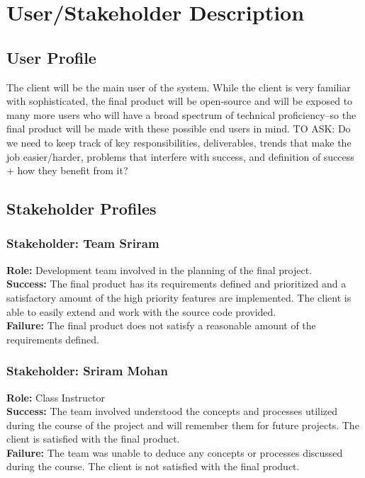 \documentclass{article}
\begin{document}
\section{User/Stakeholder Description}

\subsection{User Profile}
The client will be the main user of the system.  While the client is very familiar with sophisticated, the final product will be open-source and will be exposed to many more users who will have a broad spectrum of technical proficiency--so the final product will be made with these possible end users in mind.
TO ASK: Do we need to keep track of key responsibilities, deliverables, trends that make the job easier/harder, problems that interfere with success, and definition of success + how they benefit from it?

\subsection{Stakeholder Profiles}

\subsubsection{Stakeholder: Team Sriram}
\textbf{Role:} Development team involved in the planning of the final project.\\
\textbf{Success:} The final product has its requirements defined and prioritized and a satisfactory amount of the high priority features are implemented.  The client is able to easily extend and work with the source code provided.\\
\textbf{Failure:} The final product does not satisfy a reasonable amount of the requirements defined.

\subsubsection{Stakeholder: Sriram Mohan}
\textbf{Role:} Class Instructor\\
\textbf{Success:} The team involved understood the concepts and processes utilized during the course of the project and will remember them for future projects. The client is satisfied with the final product.\\
\textbf{Failure:} The team was unable to deduce any concepts or processes discussed during the course. The client is not satisfied with the final product.
\end{document}
